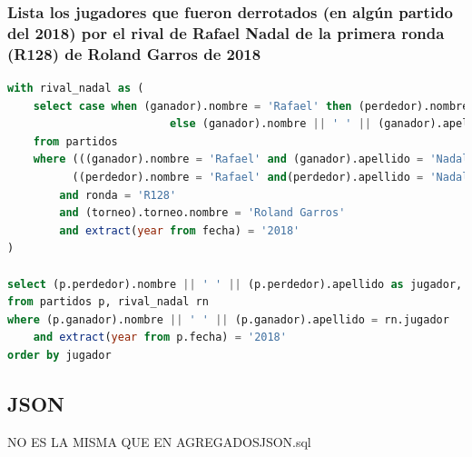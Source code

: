 \documentclass[10pt]{opticajnl}
\begin{document}
\subsubsection{Lista los jugadores que fueron derrotados (en algún partido del 2018) por el rival de Rafael Nadal de la primera ronda (R128) de Roland Garros de 2018}

\begin{lstlisting}[language=SQL]
with rival_nadal as (
	select case when (ganador).nombre = 'Rafael' then (perdedor).nombre || ' ' || (perdedor).apellido 
						 else (ganador).nombre || ' ' || (ganador).apellido end as jugador
	from partidos 
	where (((ganador).nombre = 'Rafael' and (ganador).apellido = 'Nadal') or 
		  ((perdedor).nombre = 'Rafael' and(perdedor).apellido = 'Nadal'))
		and ronda = 'R128'
		and (torneo).torneo.nombre = 'Roland Garros'
		and extract(year from fecha) = '2018'
)

select (p.perdedor).nombre || ' ' || (p.perdedor).apellido as jugador, (p.perdedor).pais.codigo_iso2 as pais
from partidos p, rival_nadal rn
where (p.ganador).nombre || ' ' || (p.ganador).apellido = rn.jugador
	and extract(year from p.fecha) = '2018'
order by jugador
\end{lstlisting}






\subsection{JSON}

NO ES LA MISMA QUE EN AGREGADOSJSON.sql
\end{document}
